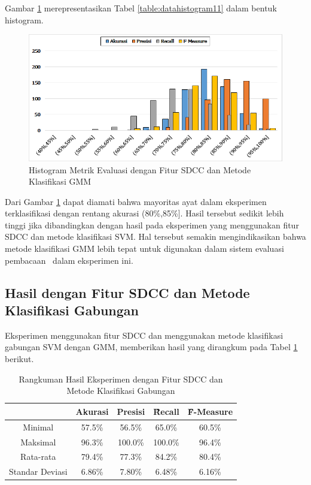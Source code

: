   Gambar \ref{fig:histogram11} merepresentasikan Tabel \ref{table:datahistogram11} dalam bentuk histogram.
  \begin{figure}
    \centering
    \includegraphics[width=\linewidth]{pics/histogram11}
    \caption{Histogram Metrik Evaluasi dengan Fitur SDCC dan Metode Klasifikasi GMM}
    \label{fig:histogram11}
  \end{figure}

  Dari Gambar \ref{fig:histogram11} dapat diamati bahwa mayoritas ayat dalam eksperimen terklasifikasi dengan rentang akurasi (80\%,85\%]. Hasil tersebut sedikit lebih tinggi jika dibandingkan dengan hasil pada eksperimen yang menggunakan fitur SDCC dan metode klasifikasi SVM. Hal tersebut semakin mengindikasikan bahwa metode klasifikasi GMM lebih tepat untuk digunakan dalam sistem evaluasi pembacaan \quran~dalam eksperimen ini.






  \subsection{Hasil dengan Fitur SDCC dan Metode Klasifikasi Gabungan}
  Eksperimen menggunakan fitur SDCC dan menggunakan metode klasifikasi gabungan SVM dengan GMM, memberikan hasil yang dirangkum pada Tabel \ref{table:sdccgabungan} berikut.

  \begin{table}
    \centering
    \caption{Rangkuman Hasil Eksperimen dengan Fitur SDCC dan Metode Klasifikasi Gabungan}
    \begin{tabular}{|c|c|c|c|c|}
      \hline
       & Akurasi & Presisi & \f{\f{Recall}} & \f{\f{F-Measure}} \\ \hline
      Minimal         & 57.5\% & 56.5\%  & 65.0\%  & 60.5\% \\ \hline
      Maksimal        & 96.3\% & 100.0\% & 100.0\% & 96.4\% \\ \hline
      Rata-rata       & 79.4\% & 77.3\%  & 84.2\%  & 80.4\% \\ \hline
      Standar Deviasi & 6.86\% & 7.80\% & 6.48\% & 6.16\%  \\ \hline
    \end{tabular}
    \label{table:sdccgabungan}
  \end{table}

